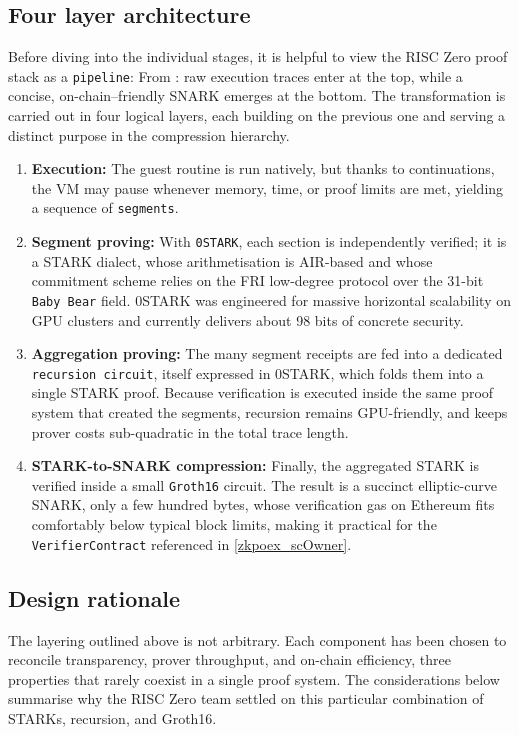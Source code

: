 \subsection{Four layer architecture} \label{risc0_4layer}
Before diving into the individual stages, it is helpful to view the RISC Zero
proof stack as a \texttt{pipeline}: From \cite{0stark_blog}: raw execution traces enter at the top, while a
concise, on-chain–friendly SNARK emerges at the bottom.  The transformation is
carried out in four logical layers, each building on the previous one and
serving a distinct purpose in the compression hierarchy.

\begin{enumerate}
  \item \textbf{Execution:}  
        The guest routine is run natively, but thanks to
        continuations, the VM may pause whenever memory, time, or proof
        limits are met, yielding a sequence of \texttt{segments}.
  \item \textbf{Segment proving:}  
        With \texttt{0STARK}, each section is independently verified; it is a 
        STARK dialect, whose arithmetisation is AIR-based and whose commitment scheme relies on the FRI low-degree protocol over the 31-bit
        \texttt{Baby Bear} field. 0STARK was engineered for
        massive horizontal scalability on GPU clusters and currently delivers
        about 98 bits of concrete security.
  \item \textbf{Aggregation proving:}  
        The many segment receipts are fed into a dedicated \texttt{recursion
        circuit}, itself expressed in 0STARK, which folds them into a single
        STARK proof. Because verification is executed inside the same proof
        system that created the segments, recursion remains GPU-friendly, and
        keeps prover costs sub-quadratic in the total trace length.
  \item \textbf{STARK-to-SNARK compression:}  
        Finally, the aggregated STARK is verified inside a small
        \texttt{Groth16} circuit. The result is a  succinct elliptic-curve
        SNARK, only a few hundred bytes, whose verification gas on Ethereum fits
        comfortably below typical block limits, making it practical for the
        \texttt{VerifierContract} referenced in \ref{zkpoex_scOwner}.
\end{enumerate}

\subsection{Design rationale}
The layering outlined above is not arbitrary.  Each component has been chosen to reconcile transparency, prover throughput, and on-chain efficiency, three properties that rarely coexist in a single proof system.  The considerations below summarise why the RISC Zero team settled on this particular combination of STARKs, recursion, and Groth16.

